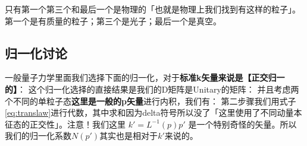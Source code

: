 只有第一个第三个和最后一个是物理的「也就是物理上我们找到有这样的粒子」。第一个是有质量的粒子；第三个是光子；最后一个是真空。

\subsection{归一化讨论}

一般量子力学里面我们选择下面的归一化，对于\textbf{标准k矢量来说是【正交归一的】}：
这个归一化选择的直接结果是我们的D矩阵是Unitary的矩阵：
并且考虑两个不同的单粒子态\textbf{这里是一般的p矢量}进行内积，我们有：
第二步骤我们用式子\cref{eq:translaw}进行代数，其中求和因为delta符号所以没了「这里使用了不同动量本征态的正交性」。注意！我们这里 $ k' = L^{-1}(p)p' $ 是一个特别奇怪的矢量。所以我们的归一化系数$ N(p') $其实也是相对于$ k' $来说的。

